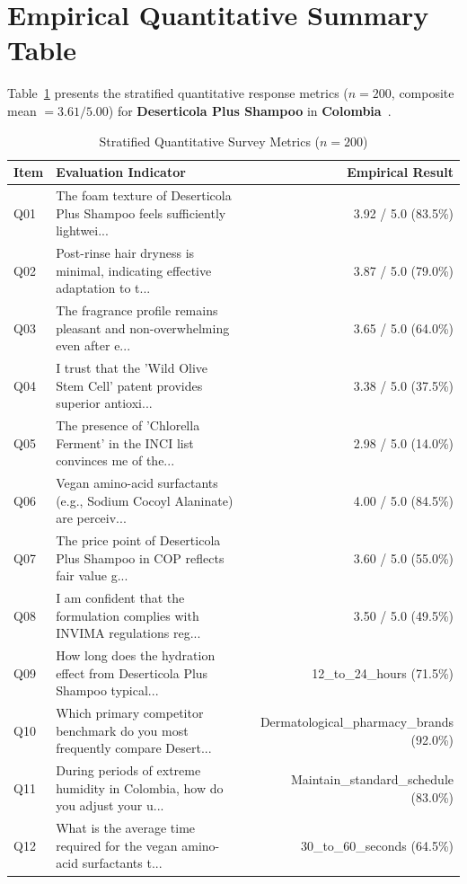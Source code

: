 \documentclass[10pt,twocolumn,a4paper]{article}
\begin{document}
\section{Empirical Quantitative Summary Table}
Table~\ref{tab:metrics} presents the stratified quantitative response metrics ($n = 200$, composite mean $= 3.61/5.00$) for \textbf{Deserticola Plus Shampoo} in \textbf{Colombia}~\cite{ref_kaggle_doi,ref_hf_doi}.

\begin{table}[t]
\centering
\caption{Stratified Quantitative Survey Metrics ($n = 200$)}
\label{tab:metrics}
\small
\begin{tabularx}{\textwidth}{l X r}
\toprule
\textbf{Item} & \textbf{Evaluation Indicator} & \textbf{Empirical Result} \\
\midrule
Q01 & The foam texture of Deserticola Plus Shampoo feels sufficiently lightwei... & 3.92 / 5.0 (83.5\%) \\
Q02 & Post-rinse hair dryness is minimal, indicating effective adaptation to t... & 3.87 / 5.0 (79.0\%) \\
Q03 & The fragrance profile remains pleasant and non-overwhelming even after e... & 3.65 / 5.0 (64.0\%) \\
Q04 & I trust that the 'Wild Olive Stem Cell' patent provides superior antioxi... & 3.38 / 5.0 (37.5\%) \\
Q05 & The presence of 'Chlorella Ferment' in the INCI list convinces me of the... & 2.98 / 5.0 (14.0\%) \\
Q06 & Vegan amino-acid surfactants (e.g., Sodium Cocoyl Alaninate) are perceiv... & 4.00 / 5.0 (84.5\%) \\
Q07 & The price point of Deserticola Plus Shampoo in COP reflects fair value g... & 3.60 / 5.0 (55.0\%) \\
Q08 & I am confident that the formulation complies with INVIMA regulations reg... & 3.50 / 5.0 (49.5\%) \\
Q09 & How long does the hydration effect from Deserticola Plus Shampoo typical... & 12\_to\_24\_hours (71.5\%) \\
Q10 & Which primary competitor benchmark do you most frequently compare Desert... & Dermatological\_pharmacy\_brands (92.0\%) \\
Q11 & During periods of extreme humidity in Colombia, how do you adjust your u... & Maintain\_standard\_schedule (83.0\%) \\
Q12 & What is the average time required for the vegan amino-acid surfactants t... & 30\_to\_60\_seconds (64.5\%) \\

\end{tabularx}
\end{table}
\end{document}
